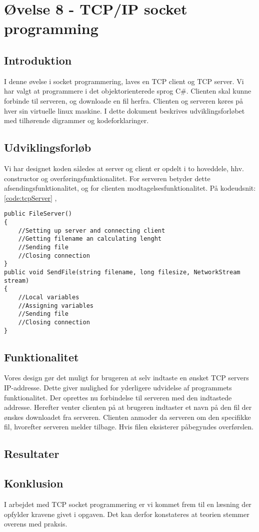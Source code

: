 \section{Øvelse 8 - TCP/IP socket programming}

\subsection{Introduktion}
I denne øvelse i socket programmering, laves en TCP client og TCP server. Vi har valgt at programmere i det objektorienterede sprog C\#. Clienten skal kunne forbinde til serveren, og downloade en fil herfra. Clienten og serveren køres på hver sin virtuelle linux maskine. I dette dokument beskrives udviklingsforløbet med tilhørende digrammer og kodeforklaringer.
\subsection{Udviklingsforløb}
Vi har designet koden således at server og client er opdelt i to hoveddele, hhv. constructor og overføringsfunktionalitet. For serveren betyder dette afsendingsfunktionalitet, og for clienten modtagelsesfunktionalitet. På kodeudsnit: \ref{code:tcpServer} ,

\begin{lstlisting}[caption = Hoveddesign for server,label=code:tcpServer]
public FileServer()
{
	//Setting up server and connecting client
	//Getting filename an calculating lenght
	//Sending file 
	//Closing connection
}
public void SendFile(string filename, long filesize, NetworkStream stream)
{
	//Local variables
	//Assigning variables
	//Sending file
	//Closing connection
}
\end{lstlisting}

\subsection{Funktionalitet}
Vores design gør det muligt for brugeren at selv indtaste en ønsket TCP servers IP-addresse. Dette giver mulighed for yderligere udvidelse af programmets funktionalitet. Der oprettes nu forbindelse til serveren med den indtastede addresse. Herefter venter clienten på at brugeren indtaster et navn på den fil der ønskes downloadet fra serveren. Clienten  anmoder da serveren om den specifikke fil, hvorefter serveren melder tilbage. Hvis filen eksisterer påbegyndes overførslen.

\subsection{Resultater}

\subsection{Konklusion}
I arbejdet med TCP socket programmering er vi kommet frem til en læsning der opfylder kravene givet i opgaven. Det kan derfor konstateres at teorien stemmer overens med praksis.